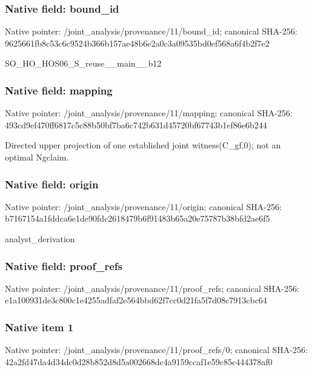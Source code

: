 \documentclass[10pt,a4paper]{article}
\begin{document}
\subsubsection{Native field: bound\_\allowbreak{}id}
Native pointer: /joint\_\allowbreak{}analysis/provenance/11/bound\_\allowbreak{}id; canonical SHA-256: 9625661fb8c53c6c9524b366b157ae48b6e2a0c3a09535bd0ef568a6f4b2f7e2

\begingroup\raggedright\sloppy SO\_\allowbreak{}HO\_\allowbreak{}HOS06\_\allowbreak{}S\_\allowbreak{}reuse\_\allowbreak{}\_\allowbreak{}main\_\allowbreak{}\_\allowbreak{}b12\par\endgroup

\subsubsection{Native field: mapping}
Native pointer: /joint\_\allowbreak{}analysis/provenance/11/mapping; canonical SHA-256: 493cd9ef470ff6817c5c88b50bf7ba6c742b631d45720bf67743b1ef86e6b244

\begingroup\raggedright\sloppy Directed upper projection of one established joint witness(C\_\allowbreak{}gf,\allowbreak{}0);\allowbreak{} not an optimal Ngclaim.\par\endgroup

\subsubsection{Native field: origin}
Native pointer: /joint\_\allowbreak{}analysis/provenance/11/origin; canonical SHA-256: b7167154a1fddca6e1de90fdc2618479b6f91483b65a20e75787b38bfd2ae6f5

\begingroup\raggedright\sloppy analyst\_\allowbreak{}derivation\par\endgroup

\subsubsection{Native field: proof\_\allowbreak{}refs}
Native pointer: /joint\_\allowbreak{}analysis/provenance/11/proof\_\allowbreak{}refs; canonical SHA-256: e1a100931de3c800c1e4255adfaf2e564bbd62f7cc0d21fa5f7d08c7913cbc64

\subsubsection{Native item 1}
Native pointer: /joint\_\allowbreak{}analysis/provenance/11/proof\_\allowbreak{}refs/0; canonical SHA-256: 42a2fd47da4d34dc0d28b852d8d5a002668dc4a9159ccaf1e59c85c444378af0
\end{document}
